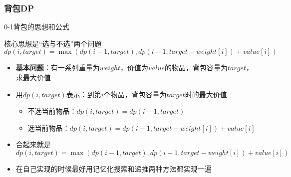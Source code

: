 \subsubsection{背包\textsc{DP}}

\begin{frame}{0-1背包的思想和公式}
  \begin{alertblock}{核心思想是“选与不选”两个问题}
    \begin{equation*}
      dp(i,target)=\max(dp(i-1,target),dp(i-1,target-weight[i])+value[i])
    \end{equation*}
  \end{alertblock}
  \begin{itemize}
    \item \textbf{基本问题}：有一系列重量为$weight$，价值为$value$的物品，背包容量为$target$，求最大价值
    \item  用$dp(i,target)$表示：\textsc{到第$i$个物品，背包容量为$target$时的最大价值}
           \begin{itemize}
            \item 不选当前物品：$dp(i, target)=dp(i-1,target)$
            \item 选当前物品：$dp(i, target)=dp(i-1,target-weight[i])+value[i]$
           \end{itemize}
    \item  合起来就是$dp(i,target)=\max(dp(i-1,target),dp(i-1,target-weight[i])+value[i])$
    \item 在自己实现的时候最好用记忆化搜索和递推两种方法都实现一遍    
  \end{itemize}
\end{frame}


